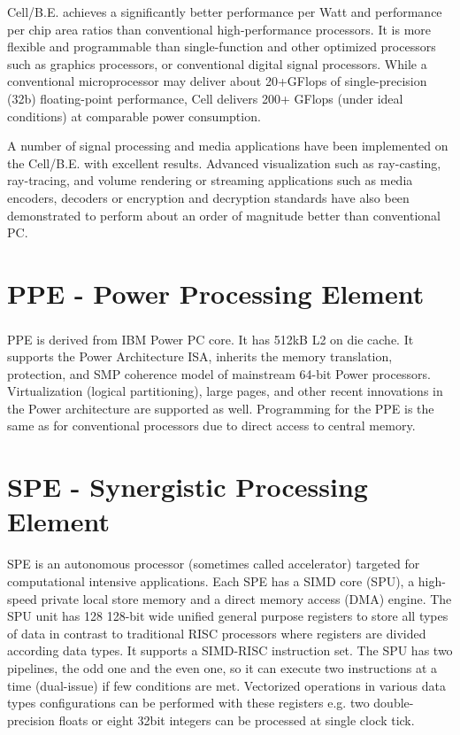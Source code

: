 Cell/B.E. achieves a significantly better performance per Watt and performance per chip area ratios than conventional high-performance processors.
It is more flexible and programmable than single-function and other optimized processors such as graphics processors, or conventional digital signal processors.
While a conventional microprocessor may deliver about 20+GFlops of single-precision (32b) floating-point performance, Cell delivers 200+ GFlops (under ideal conditions) at comparable power consumption.

A number of signal processing and media applications have been implemented on the Cell/B.E. with excellent results.
Advanced visualization such as ray-casting, ray-tracing, and volume rendering or streaming applications such as media encoders, decoders or encryption and decryption standards have also been demonstrated to perform about an order of magnitude better than conventional PC.


\section{PPE - Power Processing Element}

PPE is derived from IBM Power PC\textsuperscript{\textregistered} core. It has 512kB L2 on die cache.
It supports the Power Architecture ISA, inherits the memory translation, protection, and SMP coherence model of mainstream 64-bit Power processors.
Virtualization (logical partitioning), large pages, and other recent innovations in the Power architecture are supported as well.
Programming for the PPE is the same as for conventional processors due to direct access to central memory.

\section{SPE - Synergistic Processing Element}

\par
SPE is an autonomous processor (sometimes called accelerator) targeted for computational intensive applications.
Each SPE has a SIMD core (SPU), a high-speed private local store memory and a direct memory access (DMA) engine.
The SPU unit has 128 128-bit wide unified general purpose registers to store all types of data in contrast to traditional RISC processors where registers are divided according data types.
It supports a SIMD-RISC instruction set.
The SPU has two pipelines, the odd one and the even one, so it can execute two instructions at a time (dual-issue) if few conditions are met.
Vectorized operations in various data types configurations can be performed with these registers e.g. two double-precision floats or eight 32bit integers can be processed at single clock tick.

